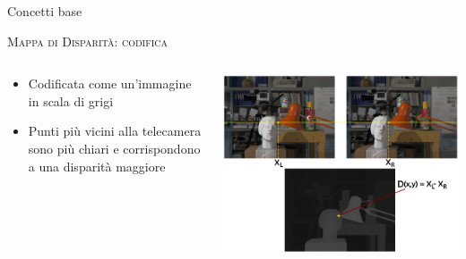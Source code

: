 \documentclass{beamer}
\begin{document}
\begin{section}{Concetti base}
\begin{frame}[t]{\textsc{Mappa di Disparit\`{a}: codifica}}
\begin{columns}
\hspace*{-4em}
\begin{column}{4cm}
\vspace{1em}
\begin{itemize}
\item  Codificata come un'immagine in scala di grigi
\item  Punti pi\`{u} vicini alla telecamera sono pi\`{u} chiari e corrispondono a una disparit\`{a} maggiore 

\end{itemize}
\end{column}
\hspace*{-3em}
\begin{column}{6cm}

\vspace{2em}

\centering
\includegraphics[width=1.2\linewidth]{./img/disparity.png}
\end{column}
\end{columns}
\end{frame}


\end{section}
\end{document}
